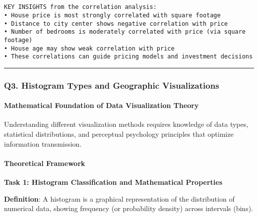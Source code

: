 \documentclass[11pt]{article}
\begin{document}
    \begin{center}
    \end{center}
    { \hspace*{\fill} \\}

    \begin{Verbatim}[commandchars=\\\{\}]

KEY INSIGHTS from the correlation analysis:
• House price is most strongly correlated with square footage
• Distance to city center shows negative correlation with price
• Number of bedrooms is moderately correlated with price (via square footage)
• House age may show weak correlation with price
• These correlations can guide pricing models and investment decisions
    \end{Verbatim}

    \begin{center}\rule{0.5\linewidth}{0.5pt}\end{center}

\subsubsection{Q3. Histogram Types and Geographic
Visualizations}\label{q3.-histogram-types-and-geographic-visualizations}

\paragraph{Mathematical Foundation of Data Visualization
Theory}\label{mathematical-foundation-of-data-visualization-theory}

Understanding different visualization methods requires knowledge of data
types, statistical distributions, and perceptual psychology principles
that optimize information transmission.

\paragraph{Theoretical Framework}\label{theoretical-framework}

\textbf{Task 1: Histogram Classification and Mathematical Properties}

\textbf{Definition}: A histogram is a graphical representation of the
distribution of numerical data, showing frequency (or probability
density) across intervals (bins).
\end{document}

